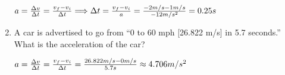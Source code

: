\documentclass[letterpaper, 12pt]{article}
\begin{document}
\begin{enumerate}
			
			\vspace{0.15in}
	\begin{center} $ a = \frac{\Delta v}{\Delta t } = \frac{v_f - v_i}{\Delta t} \Longrightarrow \Delta t = \frac{v_f - v_i}{a} = \frac{-2m/s-1m/s}{-12m/s^2} = 0.25s
		\vspace{0.15in} $
	\end{center}
	\color{black}



\item A car is advertised to go from “0 to 60 mph [26.822 m/s] in 5.7 seconds.”  What is the acceleration of the car?

	\color{red}
	\begin{center} $ a = \frac{\Delta v}{\Delta t } = \frac{v_f - v_i}{\Delta t} = \frac{26.822m/s-0m/s}{5.7s} \approx 4.706 m/s^2
	\vspace{0.15in} $
	\end{center}
	\color{black}






	
\end{enumerate}
 
\end{document}
